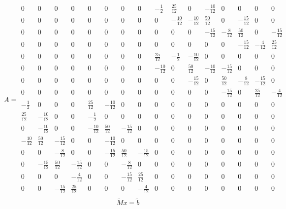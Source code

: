 \documentclass[a4paper, 12pt]{article}
\begin{document}
\[
A = 
\begin{array}{cccccccccccccccc}
0 & 0 & 0 & 0 & 0 & 0 & 0 & 0 & -\frac{1}{2} & \frac{25}{12} & 0 & -\frac{10}{12} & 0 & 0 & 0 & 0 \\
0 & 0 & 0 & 0 & 0 & 0 & 0 & 0 & 0 & -\frac{10}{12} & -\frac{10}{12} & \frac{50}{12} & 0 & -\frac{15}{12} & 0 & 0 \\
0 & 0 & 0 & 0 & 0 & 0 & 0 & 0 & 0 & 0 & 0 & -\frac{15}{12} & -\frac{8}{12} & \frac{50}{12} & 0 & -\frac{15}{12} \\
0 & 0 & 0 & 0 & 0 & 0 & 0 & 0 & 0 & 0 & 0 & 0 & 0 & -\frac{15}{12} & -\frac{4}{12} & \frac{25}{12} \\
0 & 0 & 0 & 0 & 0 & 0 & 0 & 0 & \frac{25}{12} & -\frac{1}{2} & -\frac{10}{12} & 0 & 0 & 0 & 0 & 0 \\
0 & 0 & 0 & 0 & 0 & 0 & 0 & 0 & -\frac{10}{12} & 0 & \frac{50}{12} & -\frac{10}{12} & -\frac{15}{12} & 0 & 0 & 0 \\
0 & 0 & 0 & 0 & 0 & 0 & 0 & 0 & 0 & 0 & -\frac{15}{12} & 0 & \frac{50}{12} & -\frac{8}{12} & -\frac{15}{12} & 0 \\
0 & 0 & 0 & 0 & 0 & 0 & 0 & 0 & 0 & 0 & 0 & 0 & -\frac{15}{12} & 0 & \frac{25}{12} & -\frac{4}{12} \\
-\frac{1}{2} & 0 & 0 & 0 & \frac{25}{12} & -\frac{10}{12} & 0 & 0 & 0 & 0 & 0 & 0 & 0 & 0 & 0 & 0 \\
\frac{25}{12} & -\frac{10}{12} & 0 & 0 & -\frac{1}{2} & 0 & 0 & 0 & 0 & 0 & 0 & 0 & 0 & 0 & 0 & 0 \\
0 & -\frac{10}{12} & 0 & 0 & -\frac{10}{12} & \frac{50}{12} & -\frac{15}{12} & 0 & 0 & 0 & 0 & 0 & 0 & 0 & 0 & 0 \\
-\frac{10}{12} & \frac{50}{12} & -\frac{15}{12} & 0 & 0 & -\frac{10}{12} & 0 & 0 & 0 & 0 & 0 & 0 & 0 & 0 & 0 & 0 \\
0 & 0 & -\frac{8}{12} & 0 & 0 & -\frac{15}{12} & \frac{50}{12} & -\frac{15}{12} & 0 & 0 & 0 & 0 & 0 & 0 & 0 & 0 \\

0 & -\frac{15}{12} & \frac{50}{12} & -\frac{15}{12} & 0 & 0 & -\frac{8}{12} & 0 & 0 & 0 & 0 & 0 & 0 & 0 & 0 & 0 \\
0 & 0 & 0 & -\frac{4}{12} & 0 & 0 & -\frac{15}{12} & \frac{25}{12} & 0 & 0 & 0 & 0 & 0 & 0 & 0 & 0 \\
0 & 0 & -\frac{15}{12} & \frac{25}{12} & 0 & 0 & 0 & -\frac{4}{12} & 0 & 0 & 0 & 0 & 0 & 0 & 0 & 0 \\
\end{array}
\]
\[
\widetilde{M} x=\widetilde{b}
\]
\end{document}
